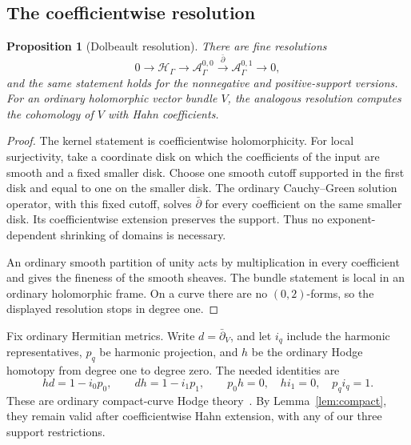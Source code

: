 \documentclass[11pt,letterpaper]{article}
\numberwithin{equation}{section}
\newtheorem{proposition}[theorem]{Proposition}
\theoremstyle{definition}
\theoremstyle{remark}
\newcommand{\HH}{\mathcal H}
\newcommand{\Acal}{\mathcal A}
\newcommand{\db}{\bar\partial}
\newcommand{\Hg}{\HH_\Gamma}
\begin{document}
\subsection{The coefficientwise resolution}
\begin{proposition}[Dolbeault resolution]
\label{prop:dolbeault}
There are fine resolutions
\[
 0\longrightarrow\Hg\longrightarrow\Acal^{0,0}_\Gamma
       \xrightarrow{\db}\Acal^{0,1}_\Gamma\longrightarrow0,
\]
and the same statement holds for the nonnegative and positive-support
versions. For an ordinary holomorphic vector bundle $V$, the analogous
resolution computes the cohomology of $V$ with Hahn coefficients.
\end{proposition}
\begin{proof}
The kernel statement is coefficientwise holomorphicity. For local
surjectivity, take a coordinate disk on which the coefficients of the
input are smooth and a fixed smaller disk. Choose one smooth cutoff
supported in the first disk and equal to one on the smaller disk.
The ordinary Cauchy--Green solution operator, with this fixed cutoff,
solves $\db$ for every coefficient on the same smaller disk. Its
coefficientwise extension preserves the support. Thus no exponent-
dependent shrinking of domains is necessary.

An ordinary smooth partition of unity acts by multiplication in every
coefficient and gives the fineness of the smooth sheaves. The bundle
statement is local in an ordinary holomorphic frame. On a curve there
are no $(0,2)$-forms, so the displayed resolution stops in degree one.
\end{proof}

Fix ordinary Hermitian metrics. Write $d=\db_V$, and let
$i_q$ include the harmonic representatives, $p_q$ be harmonic projection,
and $h$ be the ordinary Hodge homotopy from degree one to degree zero.
The needed identities are
\begin{equation}
 h d=1-i_0p_0,\qquad d h=1-i_1p_1,\qquad
 p_0h=0,\quad hi_1=0,\quad p_qi_q=1.
 \label{eq:hodge}
\end{equation}
These are ordinary compact-curve Hodge theory~\cite{narasimhan}.
By Lemma~\ref{lem:compact}, they remain valid after coefficientwise
Hahn extension, with any of our three support restrictions.
\end{document}

